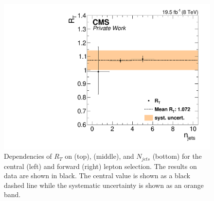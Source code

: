 \begin{figure}[htbp]
\begin{minipage}[t]{0.49\textwidth}
\end{minipage}
\begin{minipage}[t]{0.49\textwidth}
\includegraphics[width=\textwidth]{plots/BG/trigger/Triggereff_SFvsOF_Syst_AlphaT_HighHTExclusiveForward_Full2012_NJets_None.pdf}
\end{minipage}
\caption{Dependencies of $R_T$ on \mll (top), \MET (middle), and $N_{jets}$ (bottom) for the central (left) and forward (right) lepton selection. The results on data are shown in black. The central value is shown as a black dashed line while the systematic uncertainty is shown as an orange band.}
\label{fig:RTDependencies}
\end{figure} 
